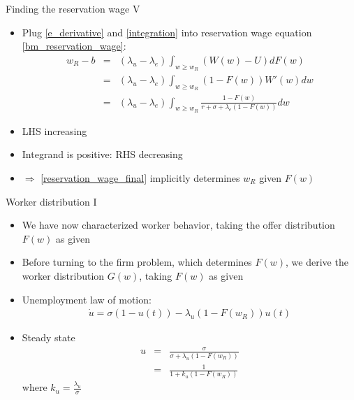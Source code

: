 \documentclass[9pt]{beamer}
\newcommand{\bit}{\begin{itemize}}
\newcommand{\eit}{\end{itemize}}
\newcommand{\lb}{\label}
\begin{document}
\begin{frame}{Finding the reservation wage V}

\bit
\setlength\itemsep{2em}

\item Plug \eqref{e_derivative} and \eqref{integration} into reservation wage equation \eqref{bm_reservation_wage}:
\begin{eqnarray}
w_R-b &=& (\lambda_u-\lambda_e) \int_{w \geq w_R} (W(w)-U) dF(w) \nonumber \\ 
 &=& (\lambda_u-\lambda_e)  \int_{w \geq w_R} (1-F(w)) W'(w)dw  \nonumber \\ 
\lb{reservation_wage_final}
 &=& (\lambda_u-\lambda_e) \int_{w \geq w_R}\frac{1-F(w)}{r+\sigma + \lambda_e(1-F(w))} dw 
\end{eqnarray}

\item LHS increasing

\item Integrand is positive: RHS decreasing

\item $\Rightarrow$ \eqref{reservation_wage_final} implicitly determines $w_R$ given $F(w)$
\eit

\end{frame}


\begin{frame}{Worker distribution I}

\bit
\setlength\itemsep{1.5em}

\item We have now characterized worker behavior, taking the offer distribution $F(w)$ as given

\item Before turning to the firm problem, which determines $F(w)$, we derive the worker distribution $G(w)$, taking $F(w)$ as given

\item Unemployment law of motion:
\begin{eqnarray}
\dot u = \sigma (1-u(t)) - \lambda_u (1-F(w_R)) u(t) \nonumber
\end{eqnarray}

\item Steady state
\begin{eqnarray}
u &=& \frac{\sigma }{\sigma + \lambda_u (1-F(w_R))} \nonumber \\
\label{u_ss}
&=& \frac{1}{1+ k_u (1-F(w_R))}
\end{eqnarray}
where $k_u = \frac{\lambda_u}{\sigma}$

\eit

\end{frame}
\end{document}
